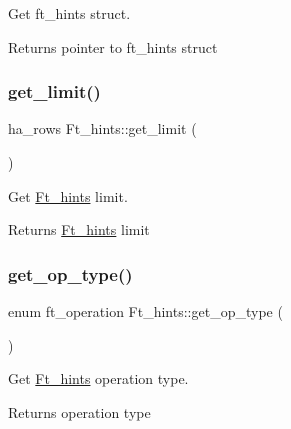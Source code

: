 Get ft\+\_\+hints struct.

\begin{DoxyReturn}{Returns}
pointer to ft\+\_\+hints struct 
\end{DoxyReturn}
\mbox{\label{classFt__hints_a819422e6239fbed66d719670a417f242}} 
\subsubsection{\texorpdfstring{get\+\_\+limit()}{get\_limit()}}
{\footnotesize\ttfamily ha\+\_\+rows Ft\+\_\+hints\+::get\+\_\+limit (\begin{DoxyParamCaption}{ }\end{DoxyParamCaption})\hspace{0.3cm}{\ttfamily [inline]}}

Get \mbox{\hyperlink{classFt__hints}{Ft\+\_\+hints}} limit.

\begin{DoxyReturn}{Returns}
\mbox{\hyperlink{classFt__hints}{Ft\+\_\+hints}} limit 
\end{DoxyReturn}
\mbox{\label{classFt__hints_add092343b5bc383cea0f277aa6c157d5}} 
\subsubsection{\texorpdfstring{get\+\_\+op\+\_\+type()}{get\_op\_type()}}
{\footnotesize\ttfamily enum ft\+\_\+operation Ft\+\_\+hints\+::get\+\_\+op\+\_\+type (\begin{DoxyParamCaption}{ }\end{DoxyParamCaption})\hspace{0.3cm}{\ttfamily [inline]}}

Get \mbox{\hyperlink{classFt__hints}{Ft\+\_\+hints}} operation type.

\begin{DoxyReturn}{Returns}
operation type 
\end{DoxyReturn}
\mbox{\label{classFt__hints_a047208adaf476b379520abcca21f49b4}} 
